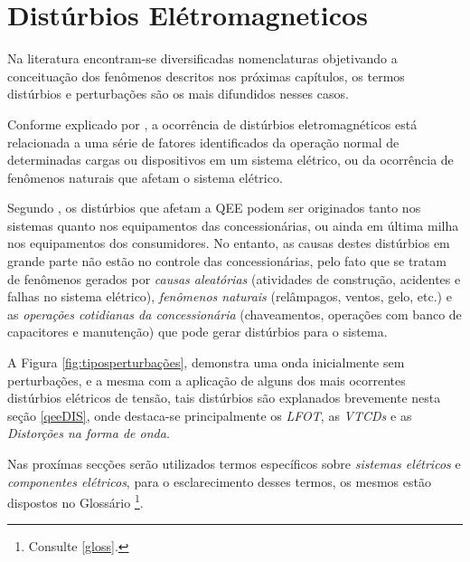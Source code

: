 \section{Distúrbios Elétromagneticos}\label{qeeDis}
\par 
Na literatura encontram-se diversificadas nomenclaturas objetivando a conceituação dos fenômenos descritos nos próximas capítulos, os termos distúrbios e perturbações são os mais difundidos nesses casos. 
\par 
Conforme explicado por \cite{FER99}, a ocorrência de distúrbios eletromagnéticos está relacionada a uma série de fatores identificados da operação normal de determinadas cargas ou dispositivos em um sistema elétrico, ou da ocorrência de fenômenos naturais que afetam o sistema elétrico.
\par 
Segundo \cite{JUN09}, os distúrbios que afetam a \ac{QEE} podem ser originados tanto nos sistemas quanto nos equipamentos das concessionárias, ou ainda em última milha nos equipamentos dos consumidores. No entanto, as causas destes distúrbios em grande parte não estão no controle das concessionárias, pelo fato que se tratam de fenômenos gerados por \emph{causas aleatórias} (atividades de construção, acidentes e falhas no sistema elétrico), \emph{fenômenos naturais} (relâmpagos, ventos, gelo, etc.) e as \emph{operações cotidianas da concessionária} (chaveamentos, operações com banco de capacitores e manutenção) que pode gerar distúrbios para o sistema.
\par 
A Figura \ref{fig:tiposperturbações}, demonstra uma onda inicialmente sem perturbações, e a mesma com a aplicação de alguns dos mais ocorrentes distúrbios elétricos de tensão, tais distúrbios são explanados brevemente nesta seção \ref{qeeDIS}, onde destaca-se principalmente os \emph{\ac{LFOT}}, as \emph{\ac{VTCDs}} e as \emph{Distorções na forma de onda}.
\par
Nas proxímas secções serão utilizados termos específicos sobre \emph{sistemas elétricos} e \emph{componentes elétricos}, para o esclarecimento desses termos, os mesmos estão dispostos no Glossário \footnote{Consulte \ref{gloss}.}.
